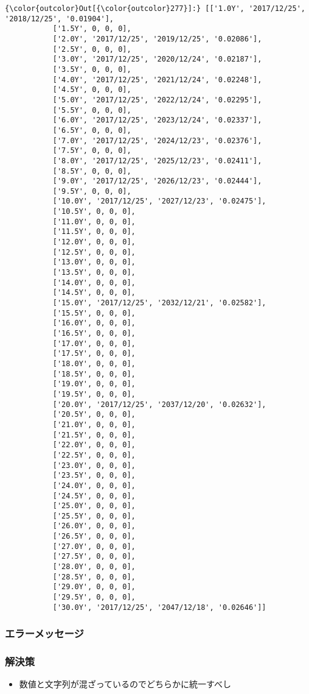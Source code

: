 \documentclass[11pt]{article}
\providecommand{\tightlist}{%
      \setlength{\itemsep}{0pt}\setlength{\parskip}{0pt}}
\begin{document}
\begin{Verbatim}[commandchars=\\\{\}]
{\color{outcolor}Out[{\color{outcolor}277}]:} [['1.0Y', '2017/12/25', '2018/12/25', '0.01904'],
           ['1.5Y', 0, 0, 0],
           ['2.0Y', '2017/12/25', '2019/12/25', '0.02086'],
           ['2.5Y', 0, 0, 0],
           ['3.0Y', '2017/12/25', '2020/12/24', '0.02187'],
           ['3.5Y', 0, 0, 0],
           ['4.0Y', '2017/12/25', '2021/12/24', '0.02248'],
           ['4.5Y', 0, 0, 0],
           ['5.0Y', '2017/12/25', '2022/12/24', '0.02295'],
           ['5.5Y', 0, 0, 0],
           ['6.0Y', '2017/12/25', '2023/12/24', '0.02337'],
           ['6.5Y', 0, 0, 0],
           ['7.0Y', '2017/12/25', '2024/12/23', '0.02376'],
           ['7.5Y', 0, 0, 0],
           ['8.0Y', '2017/12/25', '2025/12/23', '0.02411'],
           ['8.5Y', 0, 0, 0],
           ['9.0Y', '2017/12/25', '2026/12/23', '0.02444'],
           ['9.5Y', 0, 0, 0],
           ['10.0Y', '2017/12/25', '2027/12/23', '0.02475'],
           ['10.5Y', 0, 0, 0],
           ['11.0Y', 0, 0, 0],
           ['11.5Y', 0, 0, 0],
           ['12.0Y', 0, 0, 0],
           ['12.5Y', 0, 0, 0],
           ['13.0Y', 0, 0, 0],
           ['13.5Y', 0, 0, 0],
           ['14.0Y', 0, 0, 0],
           ['14.5Y', 0, 0, 0],
           ['15.0Y', '2017/12/25', '2032/12/21', '0.02582'],
           ['15.5Y', 0, 0, 0],
           ['16.0Y', 0, 0, 0],
           ['16.5Y', 0, 0, 0],
           ['17.0Y', 0, 0, 0],
           ['17.5Y', 0, 0, 0],
           ['18.0Y', 0, 0, 0],
           ['18.5Y', 0, 0, 0],
           ['19.0Y', 0, 0, 0],
           ['19.5Y', 0, 0, 0],
           ['20.0Y', '2017/12/25', '2037/12/20', '0.02632'],
           ['20.5Y', 0, 0, 0],
           ['21.0Y', 0, 0, 0],
           ['21.5Y', 0, 0, 0],
           ['22.0Y', 0, 0, 0],
           ['22.5Y', 0, 0, 0],
           ['23.0Y', 0, 0, 0],
           ['23.5Y', 0, 0, 0],
           ['24.0Y', 0, 0, 0],
           ['24.5Y', 0, 0, 0],
           ['25.0Y', 0, 0, 0],
           ['25.5Y', 0, 0, 0],
           ['26.0Y', 0, 0, 0],
           ['26.5Y', 0, 0, 0],
           ['27.0Y', 0, 0, 0],
           ['27.5Y', 0, 0, 0],
           ['28.0Y', 0, 0, 0],
           ['28.5Y', 0, 0, 0],
           ['29.0Y', 0, 0, 0],
           ['29.5Y', 0, 0, 0],
           ['30.0Y', '2017/12/25', '2047/12/18', '0.02646']]
\end{Verbatim}
            
    \subsubsection{エラーメッセージ}\label{ux30a8ux30e9ux30fcux30e1ux30c3ux30bbux30fcux30b8}

\subsubsection{解決策}\label{ux89e3ux6c7aux7b56}

\begin{itemize}
\tightlist
\item
  数値と文字列が混ざっているのでどちらかに統一すべし
\end{itemize}


    
    
    
    
\end{document}
